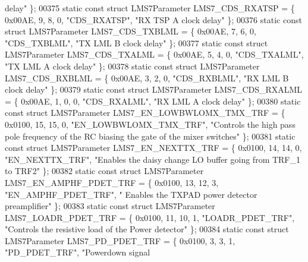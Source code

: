 \begin{DoxyCode}
{       delay"} \};
00375 \textcolor{keyword}{static} \textcolor{keyword}{const} \textcolor{keyword}{struct }LMS7Parameter LMS7_CDS_RXATSP = \{ 0x00AE, 9, 8, 0, \textcolor{stringliteral}{"CDS\_RXATSP"}, \textcolor{stringliteral}{"RX TSP A clock delay"}
       \};
00376 \textcolor{keyword}{static} \textcolor{keyword}{const} \textcolor{keyword}{struct }LMS7Parameter LMS7_CDS_TXBLML = \{ 0x00AE, 7, 6, 0, \textcolor{stringliteral}{"CDS\_TXBLML"}, \textcolor{stringliteral}{"TX LML B clock delay"}
       \};
00377 \textcolor{keyword}{static} \textcolor{keyword}{const} \textcolor{keyword}{struct }LMS7Parameter LMS7_CDS_TXALML = \{ 0x00AE, 5, 4, 0, \textcolor{stringliteral}{"CDS\_TXALML"}, \textcolor{stringliteral}{"TX LML A clock delay"}
       \};
00378 \textcolor{keyword}{static} \textcolor{keyword}{const} \textcolor{keyword}{struct }LMS7Parameter LMS7_CDS_RXBLML = \{ 0x00AE, 3, 2, 0, \textcolor{stringliteral}{"CDS\_RXBLML"}, \textcolor{stringliteral}{"RX LML B clock delay"}
       \};
00379 \textcolor{keyword}{static} \textcolor{keyword}{const} \textcolor{keyword}{struct }LMS7Parameter LMS7_CDS_RXALML = \{ 0x00AE, 1, 0, 0, \textcolor{stringliteral}{"CDS\_RXALML"}, \textcolor{stringliteral}{"RX LML A clock delay"}
       \};
00380 \textcolor{keyword}{static} \textcolor{keyword}{const} \textcolor{keyword}{struct }LMS7Parameter LMS7_EN_LOWBWLOMX_TMX_TRF = \{ 0x0100, 15, 15, 0, \textcolor{stringliteral}{"EN\_LOWBWLOMX\_TMX\_TRF"}, \textcolor{stringliteral}{
      "Controls the high pass pole frequency of the RC biasing the gate of the mixer switches"} \};
00381 \textcolor{keyword}{static} \textcolor{keyword}{const} \textcolor{keyword}{struct }LMS7Parameter LMS7_EN_NEXTTX_TRF = \{ 0x0100, 14, 14, 0, \textcolor{stringliteral}{"EN\_NEXTTX\_TRF"}, \textcolor{stringliteral}{"Enables the
       daisy change LO buffer going from TRF\_1 to TRF2"} \};
00382 \textcolor{keyword}{static} \textcolor{keyword}{const} \textcolor{keyword}{struct }LMS7Parameter LMS7_EN_AMPHF_PDET_TRF = \{ 0x0100, 13, 12, 3, \textcolor{stringliteral}{"EN\_AMPHF\_PDET\_TRF"}, \textcolor{stringliteral}{"
      Enables the TXPAD power detector preamplifier"} \};
00383 \textcolor{keyword}{static} \textcolor{keyword}{const} \textcolor{keyword}{struct }LMS7Parameter LMS7_LOADR_PDET_TRF = \{ 0x0100, 11, 10, 1, \textcolor{stringliteral}{"LOADR\_PDET\_TRF"}, \textcolor{stringliteral}{"Controls
       the resistive load of the Power detector"} \};
00384 \textcolor{keyword}{static} \textcolor{keyword}{const} \textcolor{keyword}{struct }LMS7Parameter LMS7_PD_PDET_TRF = \{ 0x0100, 3, 3, 1, \textcolor{stringliteral}{"PD\_PDET\_TRF"}, \textcolor{stringliteral}{"Powerdown signal
}
\end{DoxyCode}
